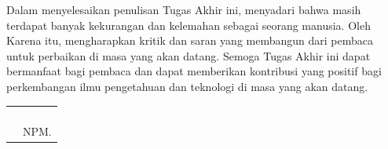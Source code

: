 Dalam menyelesaikan penulisan Tugas Akhir ini, \saya{} menyadari bahwa masih terdapat banyak kekurangan dan kelemahan \saya{} sebagai seorang manusia. Oleh Karena itu, \saya{} mengharapkan kritik dan saran yang membangun dari pembaca untuk perbaikan di masa yang akan datang. Semoga Tugas Akhir ini dapat bermanfaat bagi pembaca dan dapat memberikan kontribusi yang positif bagi perkembangan ilmu pengetahuan dan teknologi di masa yang akan datang.

\vspace*{0.1cm}
\begin{tabular}{p{7.5cm}l}
	&\tanggalKataPengantar\\
	&\\
	&\\
	&\multirow{1.5}{7.5cm}{\underline{\penulis}} \\ 
	&NPM. \npm \\
\end{tabular}